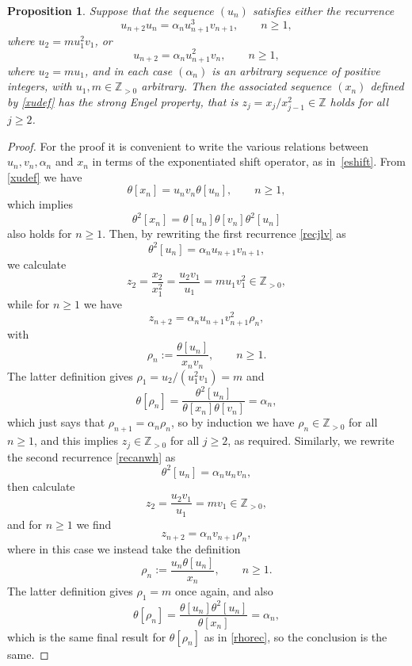 \documentclass[12pt,a4paper]{amsart}
\newtheorem{proposition}[theorem]{Proposition}
\theoremstyle{definition}
\numberwithin{equation}{section}
\newcommand\al{{\alpha}}
\newcommand{\Z}{\mathbb{Z}}
\newcommand{\Zp}{\mathbb{Z}_{>0}}
\begin{document}
\begin{proposition}
\label{recprop} 
Suppose that the sequence $(u_n)$ satisfies 
either the recurrence 
\begin{equation}
\label{recjlv}
u_{n+2}u_n = \al_{n} u_{n+1}^3 v_{n+1}, \qquad n\geq 1, 
\end{equation} 
where $u_2=mu_1^2v_1$, 
or 
\begin{equation}
\label{recanwh} 
u_{n+2} = \al_{n} u_{n+1}^2v_n, \qquad n\geq 1, 
\end{equation} 
where $u_2=mu_1$, and 
in each case $(\al_n)$ is an arbitrary sequence of positive integers, with
$u_1,m\in\Zp$ arbitrary. 
Then 
the associated sequence $(x_n)$ defined by \eqref{xudef} has the strong Engel property, that is 
$z_j =x_{j}/x_{j-1}^2 \in \Z$ holds for all $j\geq 2$. 
\end{proposition} 

\begin{proof} 
For the proof 
it is convenient to write the various relations between $u_n,v_n,\al_n$ and $x_n$ in terms 
of the exponentiated shift operator, as in~\eqref{eshift}. From \eqref{xudef} we have 
\[ 
\theta [ x_n] = u_nv_n \theta [u_n], \qquad n\geq 1, 
\] 
which implies 
\[
\theta^2 [ x_n] = \theta [u_n]\theta[v_n] \theta^2 [u_n]
\] 
also holds for $n\geq 1$.
Then, by rewriting the first recurrence \eqref{recjlv} as 
\[ 
\theta^2[u_n] = \al_n u_{n+1}v_{n+1}, 
\] 
we calculate 
\[
z_2=\frac{x_2}{x_1^2} = \frac{u_2v_1}{u_1} =mu_1v_1^2\in\Zp, 
\] 
while for $n\geq 1$ we have 
\[ 
z_{n+2} = \al_nu_{n+1}v_{n+1}^2 \rho_n, 
\] 
with 
\[ 
\rho_n := \frac{\theta[u_n]}{x_nv_n}, \qquad n\geq 1. 
\] 
The latter definition gives $\rho_1=u_2/(u_1^2v_1) = m$ and 
\begin{equation} 
\label{rhorec} 
\theta [\rho_n] = \frac{\theta^2[u_n]}{\theta[x_n]\theta[v_n]} = \al_n, 
\end{equation} 
which just says that $\rho_{n+1} = \al_n\rho_n$, so by induction we have 
$\rho_n\in\Zp$ for all $n\geq 1$, and this implies $z_j\in\Zp$ for all $j\geq 2$, as 
required. 
Similarly, we rewrite the second recurrence \eqref{recanwh} as 
\[ 
\theta^2[u_n] = \al_n u_{n}v_{n}, 
\] 
then calculate 
\[
z_2=\frac{u_2v_1}{u_1} =mv_1\in\Zp, 
\] 
and for $n\geq 1$ we find 
\[ 
z_{n+2} = \al_n v_{n+1} \rho_n, 
\] 
where in this case we instead take the definition 
\[ 
\rho_n := \frac{u_n\theta[u_n]}{x_n}, \qquad n\geq 1. 
\] 
The latter definition gives $\rho_1=m$ once again, and also 
\[ 
\theta [\rho_n] = \frac{\theta[u_n]\theta^2[u_n]}{\theta[x_n]} = \al_n, 
\] 
which is the same final result for $\theta [\rho_n]$ as in \eqref{rhorec}, 
so the conclusion is the same. 
\end{proof} 
\end{document}
